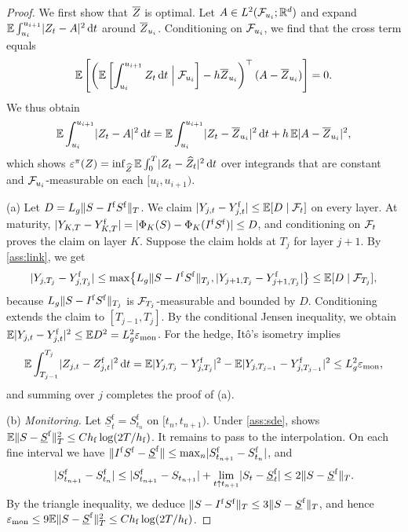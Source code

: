 \begin{proof}

We first show that $\overline Z$ is optimal. Let $A\in L^2(\mathcal{F}_{u_i};\mathbb{R}^d)$ and expand $\mathbb{E}\int_{u_i}^{u_{i+1}}\lvert Z_t-A\rvert^2\,\mathrm{d} t$ around $\overline Z_{u_i}$. Conditioning on $\mathcal{F}_{u_i}$, we find that the cross term equals
\[
\mathbb{E}\left[\left(\mathbb{E}\left[\int_{u_i}^{u_{i+1}}Z_t\,\mathrm{d} t\Bigm|\mathcal{F}_{u_i}\right]-h\overline Z_{u_i}\right)^\top(A-\overline Z_{u_i})\right]=0 .
\]
We thus obtain
\begin{equation}\label{eq:proj-best}
\mathbb{E}\int_{u_i}^{u_{i+1}}\lvert Z_t-A\rvert^2\,\mathrm{d} t=\mathbb{E}\int_{u_i}^{u_{i+1}}\lvert Z_t-\overline Z_{u_i}\rvert^2\,\mathrm{d} t+h\,\mathbb{E}\lvert A-\overline Z_{u_i}\rvert^2 ,
\end{equation}
which shows $\varepsilon^\pi(Z)=\inf_{\widehat Z}\mathbb{E}\int_0^T\lvert Z_t-\widehat Z_t\rvert^2\,\mathrm{d} t$ over integrands that are constant and $\mathcal{F}_{u_i}$-measurable on each $[u_i,u_{i+1})$.

(a) Let $D=L_g\lVert S-I^{\mathrm f} S^{\mathrm f}\rVert_T$. We claim $\lvert Y_{j,t}-Y^{\mathrm f}_{j,t}\rvert\le\mathbb{E}[D\mid\mathcal{F}_t]$ on every layer. At maturity, $\lvert Y_{K,T}-Y^{\mathrm f}_{K,T}\rvert=\lvert \Phi_K(S)-\Phi_K(I^{\mathrm f} S^{\mathrm f})\rvert\le D$, and conditioning on $\mathcal{F}_t$ proves the claim on layer $K$. Suppose the claim holds at $T_j$ for layer $j+1$. By \cref{ass:link}, we get
\[
\lvert Y_{j,T_j}-Y^{\mathrm f}_{j,T_j}\rvert\le\max\bigl\{L_g\lVert S-I^{\mathrm f} S^{\mathrm f}\rVert_{T_j},\lvert Y_{j+1,T_j}-Y^{\mathrm f}_{j+1,T_j}\rvert\bigr\}\le\mathbb{E}[D\mid\mathcal{F}_{T_j}],
\]
because $L_g\lVert S-I^{\mathrm f} S^{\mathrm f}\rVert_{T_j}$ is $\mathcal{F}_{T_j}$-measurable and bounded by $D$. Conditioning extends the claim to $[T_{j-1},T_j]$. By the conditional Jensen inequality, we obtain $\mathbb{E}\lvert Y_{j,t}-Y^{\mathrm f}_{j,t}\rvert^2\le\mathbb{E} D^2=L_g^2\varepsilon_{\mathrm{mon}}$. For the hedge, It\^o's isometry implies
\[
\mathbb{E}\int_{T_{j-1}}^{T_j}\lvert Z_{j,t}-Z^{\mathrm f}_{j,t}\rvert^2\,\mathrm{d} t=\mathbb{E}\lvert Y_{j,T_j}-Y^{\mathrm f}_{j,T_j}\rvert^2-\mathbb{E}\lvert Y_{j,T_{j-1}}-Y^{\mathrm f}_{j,T_{j-1}}\rvert^2\le L_g^2\varepsilon_{\mathrm{mon}} ,
\]
and summing over $j$ completes the proof of (a).

(b) \emph{Monitoring.} Let $\underline S^{\mathrm f}_t=S^{\mathrm f}_{t_n}$ on $[t_n,t_{n+1})$. Under \cref{ass:sde}, \cite[Thm.~4.2]{zhang2004} shows $\mathbb{E}\lVert S-\underline S^{\mathrm f}\rVert_T^2\le Ch_{\mathrm f}\log(2T/h_{\mathrm f})$. It remains to pass to the interpolation. On each fine interval we have $\lVert I^{\mathrm f} S^{\mathrm f}-\underline S^{\mathrm f}\rVert\le\max_n\lvert S^{\mathrm f}_{t_{n+1}}-S^{\mathrm f}_{t_n}\rvert$, and
\[
\lvert S^{\mathrm f}_{t_{n+1}}-S^{\mathrm f}_{t_n}\rvert\le\lvert S^{\mathrm f}_{t_{n+1}}-S_{t_{n+1}}\rvert+\lim_{t\uparrow t_{n+1}}\lvert S_t-\underline S^{\mathrm f}_t\rvert\le2\lVert S-\underline S^{\mathrm f}\rVert_T .
\]
By the triangle inequality, we deduce $\lVert S-I^{\mathrm f} S^{\mathrm f}\rVert_T\le3\lVert S-\underline S^{\mathrm f}\rVert_T$, and hence $\varepsilon_{\mathrm{mon}}\le9\mathbb{E}\lVert S-\underline S^{\mathrm f}\rVert_T^2\le Ch_{\mathrm f}\log(2T/h_{\mathrm f})$.


\end{proof}

